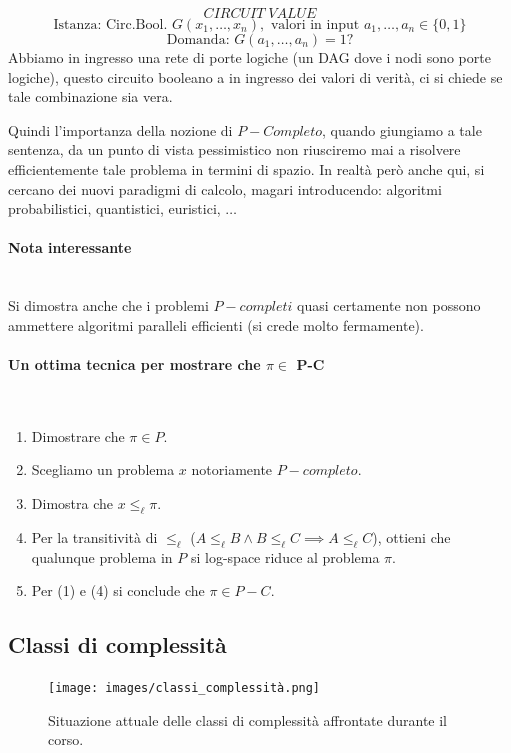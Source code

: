 \documentclass{article}
\begin{document}
$$CIRCUIT\;VALUE$$
$$\text{Istanza: Circ.Bool. }G(x_1,\dots,x_n),\text{ valori in input }a_1,\dots,a_n\in \{0,1\}$$
$$\text{Domanda: }G(a_1,\dots,a_n)=1?$$
Abbiamo in ingresso una rete di porte logiche (un DAG dove i nodi sono porte logiche), questo
circuito booleano a in ingresso dei valori di verità, ci si chiede se tale combinazione sia
vera.

Quindi l'importanza della nozione di $P-Completo$, quando giungiamo a tale sentenza, da un punto
di vista pessimistico non riusciremo mai a risolvere efficientemente tale problema in termini di spazio.
In realtà però anche qui, si cercano dei nuovi paradigmi di calcolo, magari introducendo:
algoritmi probabilistici, quantistici, euristici, $\dots$

\paragraph{Nota interessante}\mbox{}\\
Si dimostra anche che i problemi $P-completi$ quasi certamente non possono ammettere
algoritmi paralleli efficienti (si crede molto fermamente).


\paragraph{Un ottima tecnica per mostrare che $\pi\in$ P-C}\mbox{}\\
\begin{enumerate}
    \item Dimostrare che $\pi\in P$.
    \item Scegliamo un problema $x$ notoriamente $P-completo$.
    \item Dimostra che $x\leq_{\ell}\pi$.
    \item Per la transitività di $\leq_{\ell}$ ($A\leq_{\ell}B\land B\leq_{\ell} C\implies A\leq_{\ell}C$),
          ottieni che qualunque problema in $P$ si log-space riduce al problema $\pi$.
    \item Per (1) e (4) si conclude che $\pi\in P-C$.
\end{enumerate}

\subsection{Classi di complessità}
\begin{figure}[H]
    \centering
    \texttt{[image: images/classi\_complessità.png]}
    \caption{Situazione attuale delle classi di complessità affrontate durante il corso.}
\end{figure}
\end{document}
